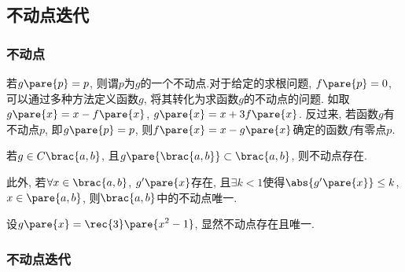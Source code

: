 \documentclass[hidelinks]{ctexart}
\begin{document}
\subsection{不动点迭代} %
\label{sub:不动点迭代}

\subsubsection{不动点} %
\label{ssub:不动点}

若$g\pare{p} = p$, 则谓$p$为$g$的一个不动点.对于给定的求根问题, $f\pare{p} = 0$, 可以通过多种方法定义函数$g$, 将其转化为求函数$g$的不动点的问题. 如取$g\pare{x} = x-f\pare{x}$, $g\pare{x} = x+3f\pare{x}$. 反过来, 若函数$g$有不动点$p$, 即$g\pare{p} = p$, 则$f\pare{x} = x-g\pare{x}$确定的函数$f$有零点$p$.
\begin{theorem}[不动点存在的条件]
\mbox{}
    \begin{cenum}
        \item 若$g\in C\brac{a,b}$, 且$g\pare{\brac{a,b}}\subset\brac{a,b}$, 则不动点存在.
        \item 此外, 若$\forall x\in \brac{a,b}$, $g'\pare{x}$存在, 且$\exists k<1$使得$\abs{g'\pare{x}} \le k$, $x\in\pare{a,b}$, 则$\brac{a,b}$中的不动点唯一.
    \end{cenum}
\end{theorem}
\begin{ex}
    设$\displaystyle g\pare{x} = \rec{3}\pare{x^2-1}$, 显然不动点存在且唯一.
\end{ex}


\subsubsection{不动点迭代} %
\label{ssub:不动点迭代}
\end{document}
